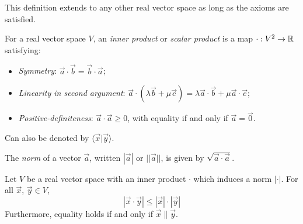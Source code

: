 \documentclass{../../template/note}
\begin{document}
    This definition extends to any other real vector space as long as the axioms are satisfied.

    \begin{definition}
        For a real vector space \(V\), an \emph{inner product} or \emph{scalar product} is a map \(\cdot: V^2 \to \mathbb R\) satisfying:
        \begin{itemize}
            \item \emph{Symmetry}: \(\vec a \cdot \vec b = \vec b \cdot \vec a\);
            \item \emph{Linearity in second argument}: \(\vec a \cdot (\lambda \vec b + \mu \vec c) = \lambda \vec a \cdot \vec b + \mu \vec a \cdot \vec c\);
            \item \emph{Positive-definiteness}: \(\vec a \cdot \vec a \geq 0\), with equality if and only if \(\vec a = \vec 0\).
        \end{itemize}
        Can also be denoted by \(\langle \vec x | \vec y \rangle\).
        
    \end{definition}
    
    \begin{definition}
        The \emph{norm} of a vector \(\vec a\), written \(|\vec a|\) or \(||\vec a||\), is given by \(\sqrt{\vec a \cdot \vec a}\).
    \end{definition}


    \begin{theorem}
        Let \(V\) be a real vector space with an inner product \(\cdot\) which induces a norm \(|\cdot|\). For all \(\vec x\), \(\vec y \in V\),
        \[
            |\vec x \cdot \vec y| \leq |\vec x|\cdot|\vec y|
        \]
        Furthermore, equality holds if and only if \(\vec x \parallel \vec y\).
    \end{theorem}
    
\end{document}
